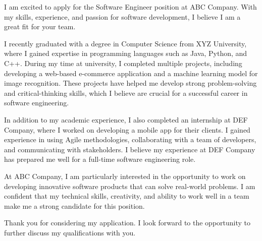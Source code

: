 \address{Level 8, 15 King Street\\Sydney, NSW 2000}

\newcommand{\positionName}{Software Engineer Position }
\newcommand{\companyName}{ABC Company}
\newcommand{\source}{\href{https://jobs.smartrecruiters.com/IAGGBS1/743999976904555-software-engineer}{\underline{website}}}

\subject{Application for \positionName}

\begin{coverletter}

I am excited to apply for the Software Engineer position at \companyName. With my skills, experience, and passion for software development, I believe I am a great fit for your team.

I recently graduated with a degree in Computer Science from XYZ University, where I gained expertise in programming languages such as Java, Python, and C++. During my time at university, I completed multiple projects, including developing a web-based e-commerce application and a machine learning model for image recognition. These projects have helped me develop strong problem-solving and critical-thinking skills, which I believe are crucial for a successful career in software engineering.

In addition to my academic experience, I also completed an internship at DEF Company, where I worked on developing a mobile app for their clients. I gained experience in using Agile methodologies, collaborating with a team of developers, and communicating with stakeholders. I believe my experience at DEF Company has prepared me well for a full-time software engineering role.
    
At ABC Company, I am particularly interested in the opportunity to work on developing innovative software products that can solve real-world problems. I am confident that my technical skills, creativity, and ability to work well in a team make me a strong candidate for this position.
    
Thank you for considering my application. I look forward to the opportunity to further discuss my qualifications with you.

\end{coverletter}

